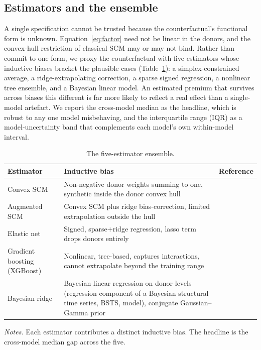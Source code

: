 \subsection{Estimators and the ensemble}\label{sec:methods}
A single specification cannot be trusted because the counterfactual's functional form is
unknown. Equation~\eqref{eq:factor} need not be linear in the donors, and the
convex-hull restriction of classical SCM may or may not bind. Rather than commit to one
form, we proxy the counterfactual with five estimators whose inductive biases bracket the
plausible cases (Table~\ref{tab:models}): a simplex-constrained average, a
ridge-extrapolating correction, a sparse signed regression, a nonlinear tree ensemble,
and a Bayesian linear model. An estimated premium that survives across biases this
different is far more likely to reflect a real effect than a single-model artefact. We
report the cross-model median as the headline, which is robust to any one model
misbehaving, and the interquartile range (IQR) as a model-uncertainty band that complements
each model's own within-model interval.
\begin{table}[h]
\centering
\caption{The five-estimator ensemble.}
\label{tab:models}
\begin{threeparttable}
\small
\begin{tabular}{@{}p{2.6cm}p{7.4cm}p{4.0cm}@{}}
\toprule
Estimator & Inductive bias & Reference \\
\midrule
Convex SCM & Non-negative donor weights summing to one, synthetic inside the donor convex hull & \citet{abadie2010}\\
Augmented SCM & Convex SCM plus ridge bias-correction, limited extrapolation outside the hull & \citet{benmichael2021}\\
Elastic net & Signed, sparse$+$ridge regression, lasso term drops donors entirely & \citet{doudchenko2016}\\
Gradient boosting (XGBoost) & Nonlinear, tree-based, captures interactions, cannot extrapolate beyond the training range & \citet{chenguestrin2016}\\
Bayesian ridge & Bayesian linear regression on donor levels (regression component of a Bayesian structural time series, BSTS, model), conjugate Gaussian--Gamma prior & \citet{brodersen2015}\\
\bottomrule
\end{tabular}
\begin{tablenotes}[flushleft]
\footnotesize
\item \textit{Notes.} Each estimator contributes a distinct inductive bias. The headline is the cross-model median gap across the five.
\end{tablenotes}
\end{threeparttable}
\end{table}

